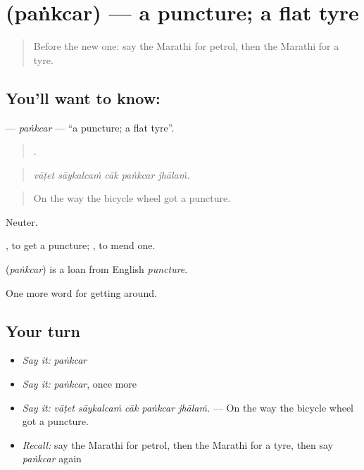 \section[\texorpdfstring{\mr{पंक्चर} (paṅkcar)}{पंक्चर (paṅkcar)}]{ (paṅkcar) — a puncture; a flat tyre}

\label{lesson:MR-C401-pankcar}



\begin{quote}
Before the new one: say the Marathi for petrol, then the Marathi for a tyre.
\end{quote}

\subsection*{You'll want to know: }
\textbf{} — \emph{paṅkcar} — \textquotedblleft{}a puncture; a flat tyre\textquotedblright{}.

\begin{quote}
    .
\end{quote}

\begin{quote}
\emph{vāṭet sāykalcaṁ cāk paṅkcar jhālaṁ.}
\end{quote}

\begin{quote}
On the way the bicycle wheel got a puncture.
\end{quote}

Neuter.

 , to get a puncture;  , to mend one.

\begin{cousinweb}
\textbf{} (\emph{paṅkcar}) is a loan from English \emph{puncture}.
\end{cousinweb}

\begin{grammarlens}[title={What you've built}]
One more word for getting around.
\end{grammarlens}

\subsection*{Your turn}
\begin{itemize}
\raggedright
  \item \emph{Say it:} \emph{paṅkcar}
  \item \emph{Say it:} \emph{paṅkcar}, once more
  \item \emph{Say it:} \emph{vāṭet sāykalcaṁ cāk paṅkcar jhālaṁ.} — On the way the bicycle wheel got a puncture.
  \item \emph{Recall:} say the Marathi for petrol, then the Marathi for a tyre, then say \emph{paṅkcar} again
\end{itemize}

